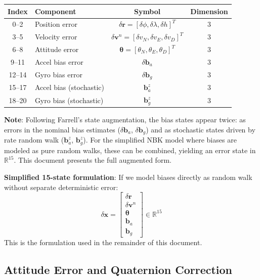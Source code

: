\documentclass[11pt,a4paper]{article}
\newcommand{\mat}[1]{\mathbf{#1}}
\newcommand{\vect}[1]{\boldsymbol{#1}}
\newcommand{\Rn}{\mathbb{R}}
\begin{document}
\begin{center}
\begin{tabular}{clcc}
    \toprule
    Index & Component & Symbol & Dimension \\
    \midrule
    0--2 & Position error & $\delta\mat{r} = [\delta\phi, \delta\lambda, \delta h]^T$ & 3 \\
    3--5 & Velocity error & $\delta\mat{v}^n = [\delta v_N, \delta v_E, \delta v_D]^T$ & 3 \\
    6--8 & Attitude error & $\vect{\theta} = [\theta_N, \theta_E, \theta_D]^T$ & 3 \\
    9--11 & Accel bias error & $\delta\mat{b}_a$ & 3 \\
    12--14 & Gyro bias error & $\delta\mat{b}_g$ & 3 \\
    15--17 & Accel bias (stochastic) & $\mat{b}_a^z$ & 3 \\
    18--20 & Gyro bias (stochastic) & $\mat{b}_g^z$ & 3 \\
    \bottomrule
\end{tabular}
\end{center}

\textbf{Note}: Following Farrell's state augmentation, the bias states appear twice: as errors in the nominal bias estimates ($\delta\mat{b}_a$, $\delta\mat{b}_g$) and as stochastic states driven by rate random walk ($\mat{b}_a^z$, $\mat{b}_g^z$). For the simplified NBK model where biases are modeled as pure random walks, these can be combined, yielding an error state in $\Rn^{15}$. This document presents the full augmented form.

\textbf{Simplified 15-state formulation}: If we model biases directly as random walk without separate deterministic error:
\begin{equation}
    \delta\mat{x} = \begin{bmatrix} \delta\mat{r} \\ \delta\mat{v}^n \\ \vect{\theta} \\ \mat{b}_a \\ \mat{b}_g \end{bmatrix} \in \Rn^{15}
\end{equation}
This is the formulation used in the remainder of this document.

\subsection{Attitude Error and Quaternion Correction}
\end{document}

